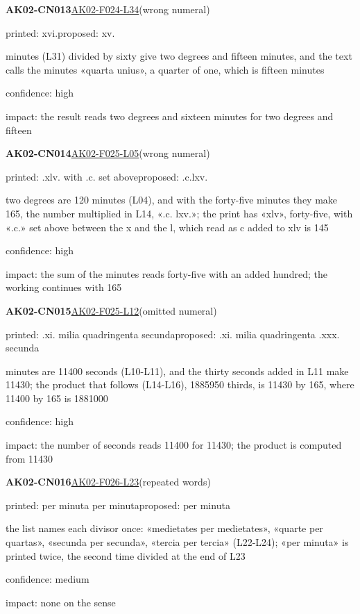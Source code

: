 \documentclass[11pt]{article}
\begin{document}
\noindent\textbf{AK02-CN013}\enspace\hyperlink{AK02-F024-L34}{AK02-F024-L34}\enspace(wrong numeral)\par\noindent printed: xvi.\enspace proposed: xv.\par{} minutes (L31) divided by sixty give two degrees and fifteen minutes, and the text calls the minutes «quarta unius», a quarter of one, which is fifteen minutes\par\noindent confidence: high\par\noindent impact: the result reads two degrees and sixteen minutes for two degrees and fifteen\par\medskip
\noindent\textbf{AK02-CN014}\enspace\hyperlink{AK02-F025-L05}{AK02-F025-L05}\enspace(wrong numeral)\par\noindent printed: .xlv. with .c. set above\enspace proposed: .c.lxv.\par\noindent two degrees are 120 minutes (L04), and with the forty-five minutes they make 165, the number multiplied in L14, «.c. lxv.»; the print has «xlv», forty-five, with «.c.» set above between the x and the l, which read as c added to xlv is 145\par\noindent confidence: high\par\noindent impact: the sum of the minutes reads forty-five with an added hundred; the working continues with 165\par\medskip
\noindent\textbf{AK02-CN015}\enspace\hyperlink{AK02-F025-L12}{AK02-F025-L12}\enspace(omitted numeral)\par\noindent printed: .xi. milia quadringenta secunda\enspace proposed: .xi. milia quadringenta .xxx. secunda\par{} minutes are 11400 seconds (L10-L11), and the thirty seconds added in L11 make 11430; the product that follows (L14-L16), 1885950 thirds, is 11430 by 165, where 11400 by 165 is 1881000\par\noindent confidence: high\par\noindent impact: the number of seconds reads 11400 for 11430; the product is computed from 11430\par\medskip
\noindent\textbf{AK02-CN016}\enspace\hyperlink{AK02-F026-L23}{AK02-F026-L23}\enspace(repeated words)\par\noindent printed: per minuta per minuta\enspace proposed: per minuta\par\noindent the list names each divisor once: «medietates per medietates», «quarte per quartas», «secunda per secunda», «tercia per tercia» (L22-L24); «per minuta» is printed twice, the second time divided at the end of L23\par\noindent confidence: medium\par\noindent impact: none on the sense\par\medskip
\end{document}

